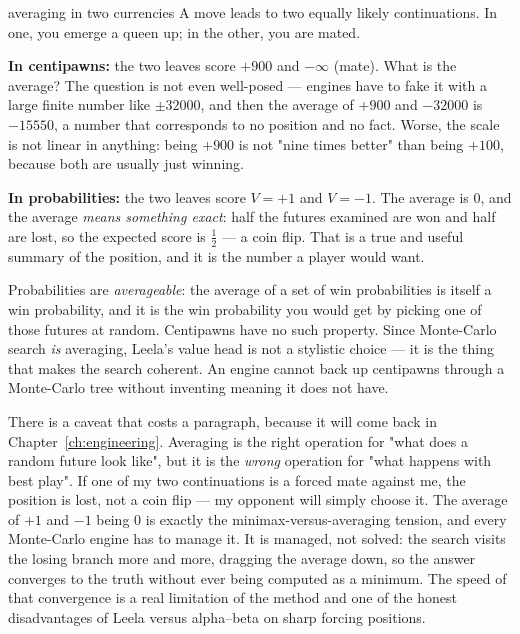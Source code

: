 \begin{worked}{averaging in two currencies}
A move leads to two equally likely continuations. In one, you emerge a queen up; in the
other, you are mated.

\textbf{In centipawns:} the two leaves score $+900$ and $-\infty$ (mate). What is the average?
The question is not even well-posed --- engines have to fake it with a large finite number
like $\pm 32000$, and then the average of $+900$ and $-32000$ is $-15550$, a number that
corresponds to no position and no fact. Worse, the scale is not linear in anything: being
$+900$ is not "nine times better" than being $+100$, because both are usually just winning.

\textbf{In probabilities:} the two leaves score $V = +1$ and $V = -1$. The average is $0$,
and the average \emph{means something exact}: half the futures examined are won and half are
lost, so the expected score is $\tfrac12$ --- a coin flip. That is a true and useful summary
of the position, and it is the number a player would want.
\end{worked}

\begin{keyidea}
Probabilities are \emph{averageable}: the average of a set of win probabilities is itself a
win probability, and it is the win probability you would get by picking one of those futures
at random. Centipawns have no such property. Since Monte-Carlo search \emph{is} averaging,
Leela's value head is not a stylistic choice --- it is the thing that makes the search
coherent. An engine cannot back up centipawns through a Monte-Carlo tree without inventing
meaning it does not have.
\end{keyidea}

There is a caveat that costs a paragraph, because it will come back in
Chapter~\ref{ch:engineering}. Averaging is the right operation for "what does a random
future look like", but it is the \emph{wrong} operation for "what happens with best play".
If one of my two continuations is a forced mate against me, the position is lost, not a coin
flip --- my opponent will simply choose it. The average of $+1$ and $-1$ being $0$ is exactly
the minimax-versus-averaging tension, and every Monte-Carlo engine has to manage it. It is
managed, not solved: the search visits the losing branch more and more, dragging the average
down, so the answer converges to the truth without ever being computed as a minimum. The
speed of that convergence is a real limitation of the method and one of the honest
disadvantages of Leela versus alpha--beta on sharp forcing positions.

